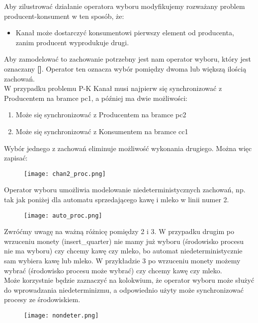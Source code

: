 \documentclass[a4paper,15pt]{article}
\begin{document}
Aby zilustrować działanie operatora wyboru modyfikujemy rozważany problem producent-konsument w ten sposób, że:
\begin{itemize}
\item Kanał może dostarczyć konsumentowi pierwszy element od producenta, zanim producent wyprodukuje drugi.
\end{itemize}
Aby zamodelować to zachowanie potrzebny jest nam operator wyboru, który jest oznaczany \textbf{[]}. Operator ten oznacza wybór pomiędzy dwoma lub większą ilością zachowań. \\
W przypadku problemu P-K Kanał musi najpierw się synchronizować z Producentem na bramce pc1, a później ma dwie możliwości: 
\begin{enumerate}
\item Może się synchronizować z Producentem na bramce pc2 
\item Może się synchronizować z Konsumentem na bramce cc1
\end{enumerate}
Wybór jednego z zachowań eliminuje możliwość wykonania drugiego. Można więc zapisać: 


\begin{figure}[H]
\centerline{\texttt{[image: chan2\_proc.png]}}
\label{fig:chan2_proc}
\end{figure}

Operator wyboru umożliwia modelowanie niedeterministycznych zachowań, np. tak jak poniżej dla automatu sprzedającego kawę i mleko w linii numer 2.

\begin{figure}[H]
\centerline{\texttt{[image: auto\_proc.png]}}
\label{fig:auto_proc}
\end{figure}
Zwróćmy uwagę na ważną różnicę pomiędzy 2 i 3. W przypadku drugim po wrzuceniu monety (insert\_quarter) nie mamy już wyboru (środowisko procesu nie ma wyboru) czy chcemy kawę czy mleko, bo automat niedeterministycznie sam wybiera kawę lub mleko. W przykładzie 3 po wrzuceniu monety możemy wybrać (środowisko procesu może wybrać) czy chcemy kawę czy mleko. \\


Może korzystnie będzie zaznaczyć na kolokwium, że operator wyboru może służyć do wprowadzania niedeterminizmu, a odpowiednio użyty może synchronizować procesy ze środowiskiem. 


\begin{figure}[H]
\centerline{\texttt{[image: nondeter.png]}}
\label{fig:auto_proc}
\end{figure}
\end{document}
